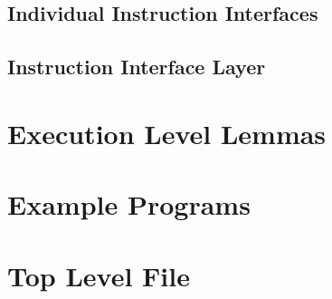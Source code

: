\documentclass[11pt,a4paper]{article}
\begin{document}
\subsection{Individual Instruction Interfaces}


































\subsection{Instruction Interface Layer}


\section{Execution Level Lemmas}





\section{Example Programs}


\section{Top Level File}


%
%
\end{document}
